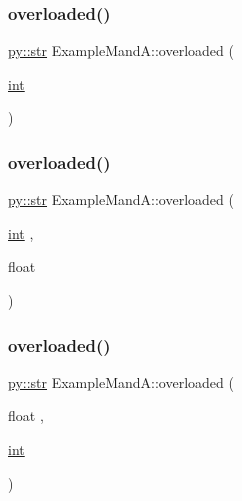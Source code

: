 \mbox{\label{class_example_mand_a_af4c8f0af4410d27d387489bea655cef9}} 
\subsubsection{\texorpdfstring{overloaded()}{overloaded()}\hspace{0.1cm}{\footnotesize\ttfamily [2/12]}}
{\footnotesize\ttfamily \mbox{\hyperlink{node_8h_a62b34ca1362fe946082b7aa0cd9be844}{py\+::str}} Example\+Mand\+A\+::overloaded (\begin{DoxyParamCaption}\item[{\mbox{\hyperlink{warnings_8h_a74f207b5aa4ba51c3a2ad59b219a423b}{int}}}]{ }\end{DoxyParamCaption})\hspace{0.3cm}{\ttfamily [inline]}}

\mbox{\label{class_example_mand_a_a8263d61b8cbdb671ad521e8904d55f22}} 
\subsubsection{\texorpdfstring{overloaded()}{overloaded()}\hspace{0.1cm}{\footnotesize\ttfamily [3/12]}}
{\footnotesize\ttfamily \mbox{\hyperlink{node_8h_a62b34ca1362fe946082b7aa0cd9be844}{py\+::str}} Example\+Mand\+A\+::overloaded (\begin{DoxyParamCaption}\item[{\mbox{\hyperlink{warnings_8h_a74f207b5aa4ba51c3a2ad59b219a423b}{int}}}]{,  }\item[{float}]{ }\end{DoxyParamCaption})\hspace{0.3cm}{\ttfamily [inline]}}

\mbox{\label{class_example_mand_a_a131a50fea753894566a0386659afcea8}} 
\subsubsection{\texorpdfstring{overloaded()}{overloaded()}\hspace{0.1cm}{\footnotesize\ttfamily [4/12]}}
{\footnotesize\ttfamily \mbox{\hyperlink{node_8h_a62b34ca1362fe946082b7aa0cd9be844}{py\+::str}} Example\+Mand\+A\+::overloaded (\begin{DoxyParamCaption}\item[{float}]{,  }\item[{\mbox{\hyperlink{warnings_8h_a74f207b5aa4ba51c3a2ad59b219a423b}{int}}}]{ }\end{DoxyParamCaption})\hspace{0.3cm}{\ttfamily [inline]}}

